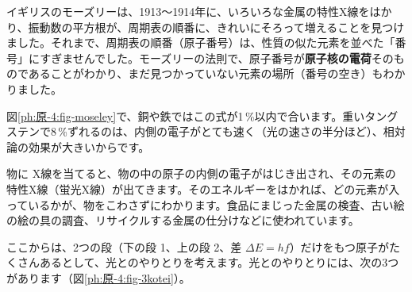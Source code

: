 \noindent\begin{minipage}[c]{0.48\linewidth}\raggedright
イギリスのモーズリーは、1913〜1914年に、いろいろな金属の特性X線をはかり、振動数の平方根が、周期表の順番に、きれいにそろって増えることを見つけました。それまで、周期表の順番（原子番号）は、性質の似た元素を並べた「番号」にすぎませんでした。モーズリーの法則で、原子番号が\textbf{原子核の電荷}そのものであることがわかり、まだ見つかっていない元素の場所（番号の空き）もわかりました。

図\ref{ph:原-4:fig-moseley}で、銅や鉄ではこの式が1\,\%以内で合います。重いタングステンで8\,\%ずれるのは、内側の電子がとても速く（光の速さの半分ほど）、相対論の効果が大きいからです。
\end{minipage}\hfill
\begin{minipage}[c]{0.49\linewidth}\centering
{}
\label{ph:原-4:fig-moseley}
\end{minipage}

\begin{phmijika}
物に X線を当てると、物の中の原子の内側の電子がはじき出され、その元素の特性X線（蛍光X線）が出てきます。そのエネルギーをはかれば、どの元素が入っているかが、物をこわさずにわかります。食品にまじった金属の検査、古い絵の絵の具の調査、リサイクルする金属の仕分けなどに使われています。
\end{phmijika}

\label{ph:原-4:sec11}
ここからは、2つの段（下の段 1、上の段 2、差 $\Delta E=hf$）だけをもつ原子がたくさんあるとして、光とのやりとりを考えます。光とのやりとりには、次の3つがあります（図\ref{ph:原-4:fig-3kotei}）。


